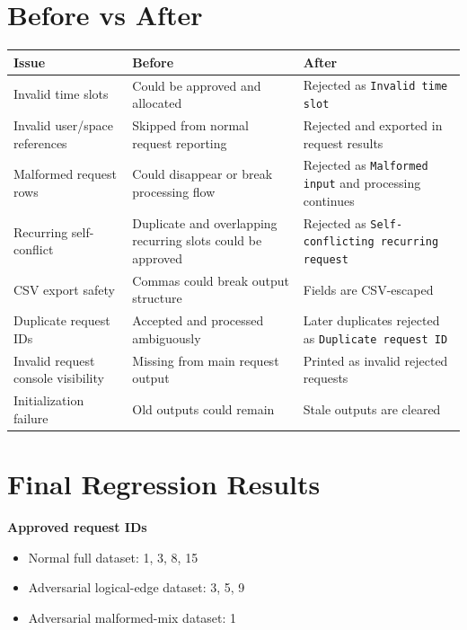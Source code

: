\documentclass[12pt,a4paper]{article}
\begin{document}
\section{Before vs After}
\begin{center}
\footnotesize
\begin{tabularx}{\textwidth}{@{} p{4.0cm} X X @{}}
\toprule
\textbf{Issue} & \textbf{Before} & \textbf{After} \\
\midrule
Invalid time slots & Could be approved and allocated & Rejected as \texttt{Invalid time slot} \\
Invalid user/space references & Skipped from normal request reporting & Rejected and exported in request results \\
Malformed request rows & Could disappear or break processing flow & Rejected as \texttt{Malformed input} and processing continues \\
Recurring self-conflict & Duplicate and overlapping recurring slots could be approved & Rejected as \texttt{Self-conflicting recurring request} \\
CSV export safety & Commas could break output structure & Fields are CSV-escaped \\
Duplicate request IDs & Accepted and processed ambiguously & Later duplicates rejected as \texttt{Duplicate request ID} \\
Invalid request console visibility & Missing from main request output & Printed as invalid rejected requests \\
Initialization failure & Old outputs could remain & Stale outputs are cleared \\
\bottomrule
\end{tabularx}
\end{center}
\normalsize

\section{Final Regression Results}
\textbf{Approved request IDs}
\begin{itemize}
    \item Normal full dataset: 1, 3, 8, 15
    \item Adversarial logical-edge dataset: 3, 5, 9
    \item Adversarial malformed-mix dataset: 1
\end{itemize}
\end{document}
